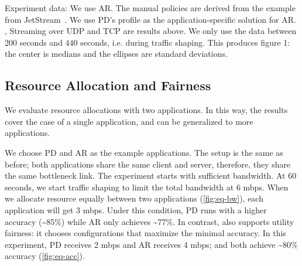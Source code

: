  Experiment data: We use AR. The manual policies are derived from
the example from JetStream~\cite{rabkin2014aggregation}. We use PD's profile as
the application-specific solution for AR. \sysname{}, Streaming over UDP and TCP
are results above. We only use the data between 200 seconds and 440 seconds,
i.e. during traffic shaping. This produces figure 1: the center is medians and
the ellipses are standard deviations.

\subsection{Resource Allocation and Fairness}
\label{sec:multi-task-alloc}

We evaluate resource allocations with two applications. In this way, the results
cover the case of a single application, and can be generalized to more
applications.

We choose PD and AR as the example applications. The setup is the same as
before; both applications share the same client and server, therefore, they
share the same bottleneck link. The experiment starts with sufficient
bandwidth. At 60 seconds, we start traffic shaping to limit the total bandwidth
at 6 mbps. When we allocate resource equally between two applications
(\autoref{fig:eq-bw}), each application will get 3 mbps. Under this condition,
PD runs with a higher accuracy (\textasciitilde 85\%) while AR only achieves
\textasciitilde 77\%. In contrast, \sysname{} also supports utility fairness: it
chooses configurations that maximize the minimal accuracy. In this experiment,
PD receives 2 mbps and AR receives 4 mbps; and both achieve \textasciitilde 80\%
accuracy (\autoref{fig:eq-acc}).

